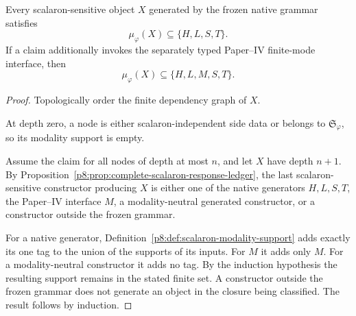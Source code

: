 \documentclass[12pt,a4paper]{article}
\begin{document}
\begin{lemma}
\label{p8:lem:scalaron-modality-support-induction}
Every scalaron-sensitive object $X$ generated by the frozen native grammar
satisfies
\[
    \mu_{\varphi}(X)\subseteq\{H,L,S,T\}.
\]
If a claim additionally invokes the separately typed Paper--IV finite-mode
interface, then
\[
    \mu_{\varphi}(X)\subseteq\{H,L,M,S,T\}.
\]
\end{lemma}

\begin{proof}
Topologically order the finite dependency graph of $X$.

At depth zero, a node is either scalaron-independent side data or belongs to
$\mathfrak S_{\varphi}$, so its modality support is empty.

Assume the claim for all nodes of depth at most $n$, and let $X$ have depth
$n+1$.  By Proposition~\ref{p8:prop:complete-scalaron-response-ledger}, the
last scalaron-sensitive constructor producing $X$ is either one of the native
generators $H,L,S,T$, the Paper--IV interface $M$, a modality-neutral generated
constructor, or a constructor outside the frozen grammar.

For a native generator, Definition~\ref{p8:def:scalaron-modality-support} adds
exactly its one tag to the union of the supports of its inputs.  For $M$ it
adds only $M$.  For a modality-neutral constructor it adds no tag.  By the
induction hypothesis the resulting support remains in the stated finite set.
A constructor outside the frozen grammar does not generate an object in the
closure being classified.  The result follows by induction. \qedhere
\end{proof}
\end{document}
